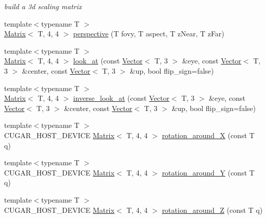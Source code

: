 \begin{DoxyCompactItemize}
\begin{DoxyCompactList}\small\item\em build a 3d scaling matrix \end{DoxyCompactList}\item 
{\footnotesize template$<$typename T $>$ }\\\hyperlink{structcugar_1_1_matrix}{Matrix}$<$ T, 4, 4 $>$ \hyperlink{group___matrices_module_ga790ca51701b1449de8eab83893034637}{perspective} (T fovy, T aspect, T z\+Near, T z\+Far)
\item 
{\footnotesize template$<$typename T $>$ }\\\hyperlink{structcugar_1_1_matrix}{Matrix}$<$ T, 4, 4 $>$ \hyperlink{group___matrices_module_gac6ae11f2364374a0f668719e4aa2e125}{look\+\_\+at} (const \hyperlink{structcugar_1_1_vector}{Vector}$<$ T, 3 $>$ \&eye, const \hyperlink{structcugar_1_1_vector}{Vector}$<$ T, 3 $>$ \&center, const \hyperlink{structcugar_1_1_vector}{Vector}$<$ T, 3 $>$ \&up, bool flip\+\_\+sign=false)
\item 
{\footnotesize template$<$typename T $>$ }\\\hyperlink{structcugar_1_1_matrix}{Matrix}$<$ T, 4, 4 $>$ \hyperlink{group___matrices_module_gac14726d6904fc9bad43cf33757e9fcaa}{inverse\+\_\+look\+\_\+at} (const \hyperlink{structcugar_1_1_vector}{Vector}$<$ T, 3 $>$ \&eye, const \hyperlink{structcugar_1_1_vector}{Vector}$<$ T, 3 $>$ \&center, const \hyperlink{structcugar_1_1_vector}{Vector}$<$ T, 3 $>$ \&up, bool flip\+\_\+sign=false)
\item 
{\footnotesize template$<$typename T $>$ }\\C\+U\+G\+A\+R\+\_\+\+H\+O\+S\+T\+\_\+\+D\+E\+V\+I\+CE \hyperlink{structcugar_1_1_matrix}{Matrix}$<$ T, 4, 4 $>$ \hyperlink{group___matrices_module_ga96490d5b84762c163e1420ec687b548e}{rotation\+\_\+around\+\_\+X} (const T q)
\item 
{\footnotesize template$<$typename T $>$ }\\C\+U\+G\+A\+R\+\_\+\+H\+O\+S\+T\+\_\+\+D\+E\+V\+I\+CE \hyperlink{structcugar_1_1_matrix}{Matrix}$<$ T, 4, 4 $>$ \hyperlink{group___matrices_module_gae9bd2299be5c9fabb44c201f74daac31}{rotation\+\_\+around\+\_\+Y} (const T q)
\item 
{\footnotesize template$<$typename T $>$ }\\C\+U\+G\+A\+R\+\_\+\+H\+O\+S\+T\+\_\+\+D\+E\+V\+I\+CE \hyperlink{structcugar_1_1_matrix}{Matrix}$<$ T, 4, 4 $>$ \hyperlink{group___matrices_module_ga51992445e107a4f8fcc79ce8c52a2fdd}{rotation\+\_\+around\+\_\+Z} (const T q)

\end{DoxyCompactItemize}
